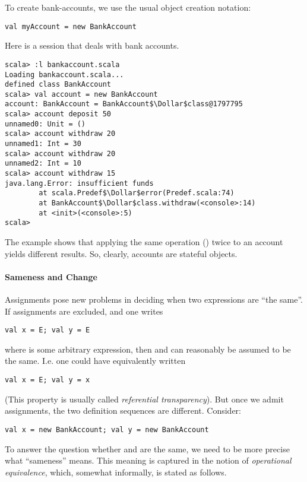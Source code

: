 To create bank-accounts, we use the usual object creation notation:
\begin{lstlisting}
val myAccount = new BankAccount
\end{lstlisting}

\example Here is a  session that deals with bank
accounts.

\begin{lstlisting}
scala> :l bankaccount.scala
Loading bankaccount.scala...
defined class BankAccount
scala> val account = new BankAccount
account: BankAccount = BankAccount$\Dollar$class@1797795
scala> account deposit 50
unnamed0: Unit = ()
scala> account withdraw 20
unnamed1: Int = 30
scala> account withdraw 20
unnamed2: Int = 10
scala> account withdraw 15
java.lang.Error: insufficient funds
        at scala.Predef$\Dollar$error(Predef.scala:74)
        at BankAccount$\Dollar$class.withdraw(<console>:14)
        at <init>(<console>:5)
scala> 
\end{lstlisting}
The example shows that applying the same operation () twice to an account yields different results. So, clearly,
accounts are stateful objects.  

\paragraph{Sameness and Change}
Assignments pose new problems in deciding when two expressions are
``the same''.
If assignments are excluded, and one writes
\begin{lstlisting}
val x = E; val y = E
\end{lstlisting}
where  is some arbitrary expression,
then  and  can reasonably be assumed to be the same.
I.e. one could have equivalently written
\begin{lstlisting}
val x = E; val y = x
\end{lstlisting}
(This property is usually called {\em referential transparency}). But
once we admit assignments, the two definition sequences are different.
Consider:
\begin{lstlisting}
val x = new BankAccount; val y = new BankAccount
\end{lstlisting}
To answer the question whether  and  are the same, we
need to be more precise what ``sameness'' means. This meaning is
captured in the notion of {\em operational equivalence}, which,
somewhat informally, is stated as follows.

